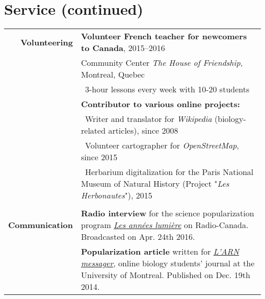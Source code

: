 \documentclass[letterpaper,10pt]{article}
\begin{document}
\section*{Service \small{(continued)}}
\begin{tabular}{r|p{13.5cm}}

\textbf{Volunteering}

 & \textbf{Volunteer French teacher for newcomers to Canada}, 2015--2016 \\
 & Community Center \emph{The House of Friendship}, Montreal, Quebec \\
 & \textbullet{}~3-hour lessons every week with 10-20 students
   \vspace{2mm} \\

 & \textbf{Contributor to various online projects:} \\
 & \textbullet{}~Writer and translator for \emph{Wikipedia}
   (biology-related articles), since 2008 \\
 & \textbullet{}~Volunteer cartographer for \emph{OpenStreetMap},
   since 2015 \\
 & \textbullet{}~Herbarium digitalization for the Paris National Museum
   of Natural History (Project "\emph{Les Herbonautes}"), 2015 \\

\multicolumn{2}{c}{} \\

\textbf{Communication}

& \textbf{Radio interview} for the science popularization program
  \href{http://ici.radio-canada.ca/emissions/les_annees_lumiere/2009-2010/chronique.asp?idChronique=404672}{\emph{Les années lumière}} on Radio-Canada.
  Broadcasted on Apr. 24th 2016.
  \vspace{2mm} \\

& \textbf{Popularization article} written for
  \href{http://arnmessager.com/2014/12/19/les-mots-damour-des-plantes-a-fleurs/}
  {\emph{L'ARN messager}}, online biology students' journal at the
  University of Montreal. Published on Dec. 19th 2014. \\

\end{tabular}

\bigskip
\bigskip


\end{document}
